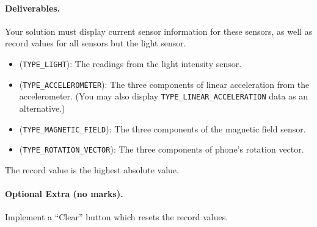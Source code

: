 \documentclass[10pt]{article}
\begin{document}
\paragraph{Deliverables.} Your solution must display current sensor information for these sensors, as well as record values for all sensors but the light sensor.
\vspace*{-0.5em}
\begin{itemize}
\item ({\tt TYPE\_LIGHT}): The readings from the light intensity sensor.
\item ({\tt TYPE\_ACCELEROMETER}): The three components of linear acceleration from the accelerometer. (You may also display {\tt TYPE\_LINEAR\_ACCELERATION} data as an alternative.)
\item ({\tt TYPE\_MAGNETIC\_FIELD}): The three components of the magnetic field sensor.
\item ({\tt TYPE\_ROTATION\_VECTOR}): The three components of phone's rotation vector.
\end{itemize}
\vspace*{-0.5em}
The record value is the highest absolute value.
\paragraph{Optional Extra (no marks).} Implement a ``Clear'' button which resets the record values.
\end{document}
